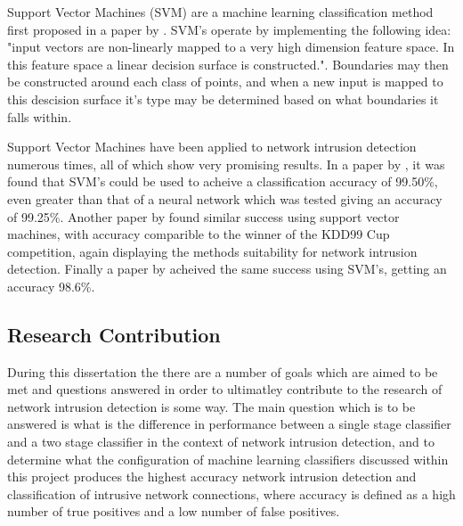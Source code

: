Support Vector Machines (SVM) are a machine learning classification method first proposed in a paper by \cite{cortes1995support}. SVM's operate by implementing the following idea: "input vectors are non-linearly mapped to a very high dimension feature space. In this feature space a linear decision surface is constructed.". Boundaries may then be constructed around each class of points, and when a new input is mapped to this descision surface it's type may be determined based on what boundaries it falls within.

Support Vector Machines have been applied to network intrusion detection numerous times, all of which show very promising results. In a paper by \cite{mukkamala2002intrusion}, it was found that SVM's could be used to acheive a classification accuracy of 99.50\%, even greater than that of a neural network which was tested giving an accuracy of 99.25\%. Another paper by \cite{kim2003network} found similar success using support vector machines, with accuracy comparible to the winner of the KDD99 Cup competition, again displaying the methods suitability for network intrusion detection. Finally a paper by \cite{bhavsar2013intrusion} acheived the same success using SVM's, getting an accuracy 98.6\%.

\subsection{Research Contribution} \label{Research Contribution}
	
During this dissertation the there are a number of goals which are aimed to be met and questions answered in order to ultimatley contribute to the research of network intrusion detection is some way. The main question which is to be answered is what is the difference in performance between a single stage classifier and a two stage classifier in the context of network intrusion detection, and to determine what the configuration of machine learning classifiers discussed within this project produces the highest accuracy network intrusion detection and classification of intrusive network connections, where accuracy is defined as a high number of true positives and a low number of false positives.
	
